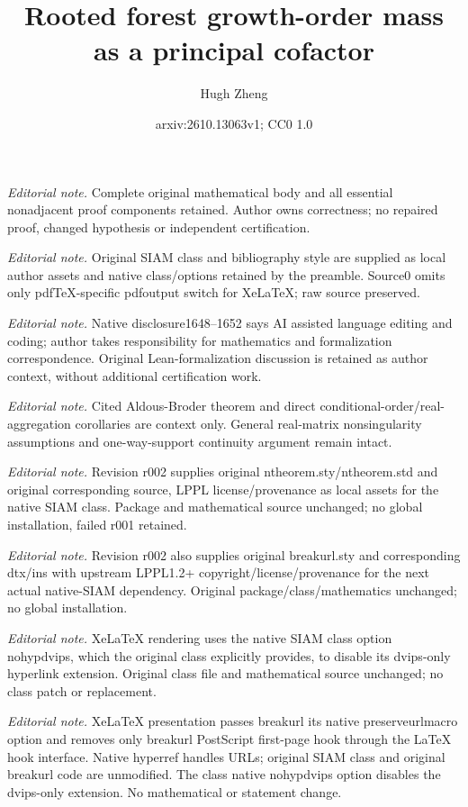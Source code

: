 \documentclass[onefignum,onetabnum,nohypdvips]{siamart250211}
\title{Rooted forest growth-order mass as a principal cofactor}
\author{Hugh Zheng}
\date{arxiv:2610.13063v1; CC0 1.0}
\numberwithin{theorem}{section}
\numberwithin{equation}{section}
\begin{document}
\maketitle
\noindent\textit{Editorial note.} Complete original mathematical body and all essential nonadjacent proof components retained. Author owns correctness; no repaired proof, changed hypothesis or independent certification.\par\medskip
\noindent\textit{Editorial note.} Original SIAM class and bibliography style are supplied as local author assets and native class/options retained by the preamble. Source0 omits only pdfTeX-specific pdfoutput switch for XeLaTeX; raw source preserved.\par\medskip
\noindent\textit{Editorial note.} Native disclosure1648--1652 says AI assisted language editing and coding; author takes responsibility for mathematics and formalization correspondence. Original Lean-formalization discussion is retained as author context, without additional certification work.\par\medskip
\noindent\textit{Editorial note.} Cited Aldous-Broder theorem and direct conditional-order/real-aggregation corollaries are context only. General real-matrix nonsingularity assumptions and one-way-support continuity argument remain intact.\par\medskip
\noindent\textit{Editorial note.} Revision r002 supplies original ntheorem.sty/ntheorem.std and original corresponding source, LPPL license/provenance as local assets for the native SIAM class. Package and mathematical source unchanged; no global installation, failed r001 retained.\par\medskip
\noindent\textit{Editorial note.} Revision r002 also supplies original breakurl.sty and corresponding dtx/ins with upstream LPPL1.2+ copyright/license/provenance for the next actual native-SIAM dependency. Original package/class/mathematics unchanged; no global installation.\par\medskip
\noindent\textit{Editorial note.} XeLaTeX rendering uses the native SIAM class option nohypdvips, which the original class explicitly provides, to disable its dvips-only hyperlink extension. Original class file and mathematical source unchanged; no class patch or replacement.\par\medskip
\noindent\textit{Editorial note.} XeLaTeX presentation passes breakurl its native preserveurlmacro option and removes only breakurl PostScript first-page hook through the LaTeX hook interface. Native hyperref handles URLs; original SIAM class and original breakurl code are unmodified. The class native nohypdvips option disables the dvips-only extension. No mathematical or statement change.\par\medskip
\end{document}
